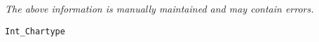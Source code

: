 \label{pkg:int\_chartype}

{\tiny \it The above information is manually maintained and may contain errors.}
\begin{verbatim}
Int_Chartype
\end{verbatim}
